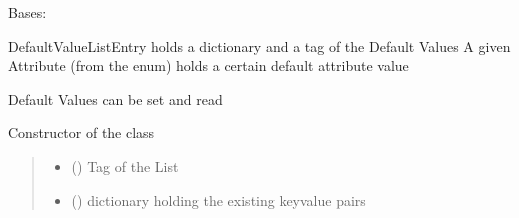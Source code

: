 \documentclass[letterpaper,10pt,english]{sphinxmanual}
\begin{document}
\begin{fulllineitems}
\label{\detokenize{apidoc/src.osm_configurator.model.project.configuration:src.osm_configurator.model.project.configuration.default_value_list_entry.DefaultValueListEntry}}
\pysigstartsignatures
{}
\pysigstopsignatures
\sphinxAtStartPar
Bases: 

\sphinxAtStartPar
DefaultValueListEntry holds a dictionary and a tag of the Default Values
A given Attribute (from the enum) holds a certain default attribute value

\sphinxAtStartPar
Default Values can be set and read

\begin{fulllineitems}
\label{\detokenize{apidoc/src.osm_configurator.model.project.configuration:src.osm_configurator.model.project.configuration.default_value_list_entry.DefaultValueListEntry.__init__}}
\pysigstartsignatures
{}
\pysigstopsignatures
\sphinxAtStartPar
Constructor of the class
\begin{quote}\begin{description}
\begin{itemize}
\item {} 
\sphinxAtStartPar
{} () \textendash{} Tag of the List

\item {} 
\sphinxAtStartPar
{} () \textendash{} dictionary holding the existing key\sphinxhyphen{}value pairs

\end{itemize}

\end{description}\end{quote}


\end{fulllineitems}
\end{fulllineitems}
\end{document}
